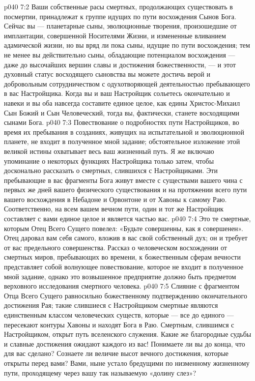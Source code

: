 \vs p040 7:2 Ваши собственные расы смертных, продолжающих существовать в посмертии, принадлежат к группе идущих по пути восхождения Сынов Бога. Сейчас вы --- планетарные сыны, эволюционные творения, произошедшие от имплантации, совершенной Носителями Жизни, и измененные вливанием адамической жизни, но вы вряд ли пока сыны, идущие по пути восхождения; тем не менее вы действительно сыны, обладающие потенциалом восхождения --- даже до высочайших вершин славы и достижения божественности, --- и этот духовный статус восходящего сыновства вы можете достичь верой и добровольным сотрудничеством с одухотворяющей деятельностью пребывающего в вас Настройщика. Когда вы и ваш Настройщик сольетесь окончательно и навеки и вы оба навсегда составите единое целое, как едины Христос\hyp{}Михаил Сын Божий и Сын Человеческий, тогда вы, фактически, станете восходящими сынами Бога.
\vs p040 7:3 Повествование о подробностях пути Настройщиков, во время их пребывания в созданиях, живущих на испытательной и эволюционной планете, не входит в полученное мной задание; обстоятельное изложение этой великой истины охватывает весь ваш жизненный путь. Я же включаю упоминание о некоторых функциях Настройщика только затем, чтобы досконально рассказать о смертных, слившихся с Настройщиками. Эти пребывающие в вас фрагменты Бога живут вместе с существами вашего чина с первых же дней вашего физического существования и на протяжении всего пути вашего восхождения в Небадоне и Орвонтоне и от Хавоны к самому Раю. Соответственно, на всем вашем вечном пути, один и тот же Настройщик составляет с вами единое целое и является частью вас.
\vs p040 7:4 Это те смертные, которым Отец Всего Сущего повелел: «Будьте совершенны, как я совершенен». Отец даровал вам себя самого, вложив в вас свой собственный дух;  он и требует от вас предельного совершенства. Рассказ о человеческом восхождении от смертных миров, пребывающих во времени, к божественным сферам вечности представляет собой волнующее повествование, которое не входит в полученное мной задание, однако это возвышенное предприятие должно быть предметом верховного исследования смертного человека.
\vs p040 7:5 Слияние с фрагментом Отца Всего Сущего равносильно божественному подтверждению окончательного достижения Рая; такие слившиеся с Настройщиком смертные являются единственным классом человеческих существ, которые --- все до единого --- пересекают контуры Хавоны и находят Бога в Раю. Смертным, слившимся с Настройщиком, открыт путь вселенского служения. Какие же благородные судьбы и славные достижения ожидают каждого из вас! Понимаете ли вы до конца, что для вас сделано? Сознаете ли величие высот вечного достижения, которые открыты перед вами? Вами, ныне устало бредущими по низменному жизненному пути, проходящему через вашу так называемую «долину слез»?
